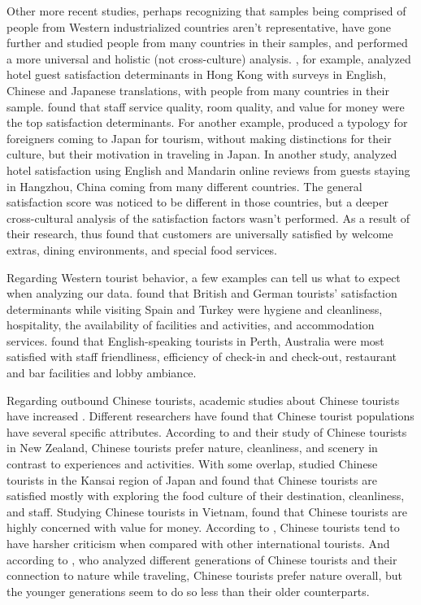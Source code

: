 Other more recent studies, perhaps recognizing that samples being comprised of people from Western industrialized countries aren't representative, have gone further and studied people from many countries in their samples, and performed a more universal and holistic (not cross-culture) analysis. \cite{choi2001}, for example, analyzed hotel guest satisfaction determinants in Hong Kong with surveys in English, Chinese and Japanese translations, with people from many countries in their sample. \cite{choi2001} found that staff service quality, room quality, and value for money were the top satisfaction determinants. For another example, \cite{Uzama2012} produced a typology for foreigners coming to Japan for tourism, without making distinctions for their culture, but their motivation in traveling in Japan. In another study, \cite{zhou2014} analyzed hotel satisfaction using English and Mandarin online reviews from guests staying in Hangzhou, China coming from many different countries. The general satisfaction score was noticed to be different in those countries, but a deeper cross-cultural analysis of the satisfaction factors wasn't performed. As a result of their research, \cite{zhou2014} thus found that customers are universally satisfied by welcome extras, dining environments, and special food services. 

Regarding Western tourist behavior, a few examples can tell us what to expect when analyzing our data. \cite{kozak2002} found that British and German tourists' satisfaction determinants while visiting Spain and Turkey were hygiene and cleanliness, hospitality, the availability of facilities and activities, and accommodation services. \cite{shanka2004} found that English-speaking tourists in Perth, Australia were most satisfied with staff friendliness, efficiency of check-in and check-out, restaurant and bar facilities and lobby ambiance. 

Regarding outbound Chinese tourists, academic studies about Chinese tourists have increased \cite[][]{sun2017}. Different researchers have found that Chinese tourist populations have several specific attributes. According to \cite{ryan2001} and their study of Chinese tourists in New Zealand, Chinese tourists prefer nature, cleanliness, and scenery in contrast to experiences and activities. With some overlap, \cite{dongyang2015} studied Chinese tourists in the Kansai region of Japan and found that Chinese tourists are satisfied mostly with exploring the food culture of their destination, cleanliness, and staff. Studying Chinese tourists in Vietnam, \cite{truong2009} found that Chinese tourists are highly concerned with value for money. According to \cite{liu2019}, Chinese tourists tend to have harsher criticism when compared with other international tourists. And according to \cite{gao2017chinese}, who analyzed different generations of Chinese tourists and their connection to nature while traveling, Chinese tourists prefer nature overall, but the younger generations seem to do so less than their older counterparts. 

